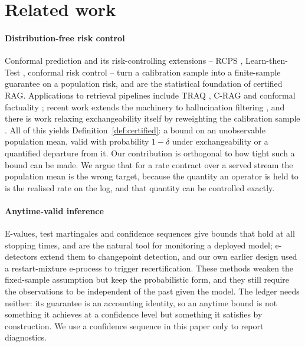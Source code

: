 \section{Related work}
\label{sec:related}

\paragraph{Distribution-free risk control}
Conformal prediction \citep{vovk2005algorithmic,angelopoulos2021gentle}
and its risk-controlling extensions -- RCPS \citep{bates2021rcps},
Learn-then-Test \citep{angelopoulos2021ltt}, conformal risk control
\citep{angelopoulos2024conformalrisk} -- turn a calibration sample into
a finite-sample guarantee on a population risk, and are the statistical
foundation of certified RAG. Applications to retrieval pipelines include
TRAQ \citep{li2024traq}, C-RAG \citep{kang2024crag} and conformal
factuality \citep{mohri2024factuality}; recent work extends the machinery
to hallucination filtering \citep{cherian2024llmuncertainty}, and there
is work relaxing exchangeability itself by reweighting the calibration
sample \citep{barber2023beyond}. All of this yields
Definition~\ref{def:certified}: a bound on an unobservable population
mean, valid with probability $1-\delta$ under exchangeability or a
quantified departure from it.
Our contribution is orthogonal to how tight such a bound can be made. We
argue that for a rate contract over a served stream the population mean
is the wrong target, because the quantity an operator is held to is the
realised rate on the log, and that quantity can be controlled exactly.

\paragraph{Anytime-valid inference}
E-values, test martingales and confidence sequences
\citep{howard2021timeuniform,ramdas2023gametheoretic,waudbysmith2024betting}
give bounds that hold at all stopping times, and are the natural tool
for monitoring a deployed model; e-detectors \citep{shin2024edetectors}
extend them to changepoint detection, and our own earlier design used a
restart-mixture e-process to trigger recertification. These methods
weaken the fixed-sample assumption but keep the probabilistic form, and
they still require the observations to be independent of the past given
the model. The ledger needs neither: its guarantee is an accounting
identity, so an anytime bound is not something it achieves at a
confidence level but something it satisfies by construction. We use a
confidence sequence in this paper only to report diagnostics.


